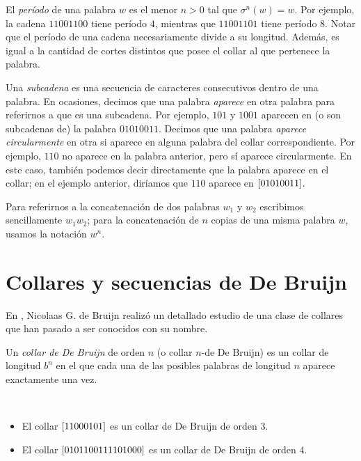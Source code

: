 El \emph{período} de una palabra $w$ es el menor $n > 0$ tal que
$\sigma^n(w) = w$. Por ejemplo, la cadena $11001100$ tiene período $4$,
mientras que $11001101$ tiene período $8$.
Notar que el período de una cadena necesariamente divide a su longitud.
Además, es igual a la cantidad de cortes distintos que posee el collar al que
pertenece la palabra.

Una \emph{subcadena} es una secuencia de caracteres consecutivos dentro de una
palabra. 
En ocasiones, decimos que una palabra \emph{aparece} en otra palabra
para referirnos a que es una subcadena. Por ejemplo, $101$ y $1001$ aparecen en
(o son subcadenas de) la palabra $01010011$. Decimos que una palabra
\emph{aparece circularmente} en otra si aparece en alguna palabra del collar
correspondiente. Por ejemplo, $110$ no aparece en la palabra anterior, pero sí
aparece circularmente. En este caso, también podemos decir directamente que
la palabra aparece en el collar; en el ejemplo anterior, diríamos que $110$
aparece en $\left[01010011\right]$.

Para referirnos a la concatenación de dos palabras $w_1$ y $w_2$ escribimos
sencillamente $w_1w_2$; para la concatenación de $n$ copias de una misma
palabra $w$, usamos la notación $w^n$.

\section{Collares y secuencias de De Bruijn}

En \cite{de-bruijn-combinatorial-problem}, Nicolaas G. de Bruijn realizó un
detallado estudio de una clase de collares que han pasado a ser conocidos con su
nombre.

\begin{definition}
	Un \emph{collar de De Bruijn} de orden $n$ (o collar $n$-de De Bruijn) es un collar
	de longitud $b^n$ en el que cada una de las posibles palabras de longitud $n$ 
	aparece exactamente una vez.
\end{definition}

\begin{examples}\ %
	\begin{itemize}
		\item El collar $\left[11000101\right]$ es un collar de De Bruijn de orden $3$.
		\item El collar $\left[0101100111101000\right]$ es un collar de De Bruijn de orden $4$.
	\end{itemize}
\end{examples}

